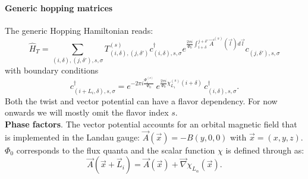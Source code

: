 \paragraph*{Generic hopping matrices}\label{sec:generic_hopping}

The generic Hopping Hamiltonian  reads: 
\begin{equation}
\hat{H}_T = \sum_{(i,\delta), (j,\delta'), s, \sigma}    T_{(i,\delta), (j,\delta')}^{(s)}    c^{\dagger}_{(i,\delta),s,\sigma }   e^{\frac{2 \pi i}{\Phi_0} \int_{i + \delta}^{j + \delta'}  \vec{A}^{(s)}(\vec{l})  d \vec{l}} c^{}_{(j,\delta'),s,\sigma }
\end{equation}
with boundary conditions 
\begin{equation}
c^{\dagger}_{(i + L_i,\delta) ,s,\sigma }   =  e^{- 2 \pi i\frac{\Phi_i^{(s)}}{\Phi_0}} \, e^{\frac{2 \pi i }{\Phi_0} \chi^{(s)}_{L_1} ( i + \delta ) } \, c^{\dagger}_{(i,\delta) ,s,\sigma }.
\end{equation}
Both the twist and  vector  potential can have a flavor dependency. For now onwards we will  mostly omit the flavor index ${s}$.\\

\noindent
\textbf{Phase factors}.  
The vector potential accounts for an orbital magnetic field that is implemented  in the Landau  gauge:  $\vec{A}(\vec{x})  =  -B(y,0,0) $ with $ \vec{x} = (x,y,z)$. $\Phi_0$ corresponds to the flux  quanta and the scalar function $\chi$ is defined  through as:
\begin{equation}
\vec{A}( \vec{x} + \vec{L}_{i} )  = \vec{A}( \vec{x} )   +  \vec{\nabla} \chi_{L_{\alpha}}(\vec{x}). 
\end{equation}

